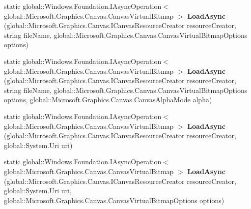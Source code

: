 \begin{DoxyCompactItemize}
\item 
\mbox{\label{class_microsoft_1_1_graphics_1_1_canvas_1_1_canvas_virtual_bitmap_a8f0bf16c94a9957cd9b4f30b7c8369f8}} 
static global\+::\+Windows.\+Foundation.\+I\+Async\+Operation$<$ global\+::\+Microsoft.\+Graphics.\+Canvas.\+Canvas\+Virtual\+Bitmap $>$ {\bfseries Load\+Async} (global\+::\+Microsoft.\+Graphics.\+Canvas.\+I\+Canvas\+Resource\+Creator resource\+Creator, string file\+Name, global\+::\+Microsoft.\+Graphics.\+Canvas.\+Canvas\+Virtual\+Bitmap\+Options options)
\item 
\mbox{\label{class_microsoft_1_1_graphics_1_1_canvas_1_1_canvas_virtual_bitmap_a72cf413902f0758c4707d6fc9c560914}} 
static global\+::\+Windows.\+Foundation.\+I\+Async\+Operation$<$ global\+::\+Microsoft.\+Graphics.\+Canvas.\+Canvas\+Virtual\+Bitmap $>$ {\bfseries Load\+Async} (global\+::\+Microsoft.\+Graphics.\+Canvas.\+I\+Canvas\+Resource\+Creator resource\+Creator, string file\+Name, global\+::\+Microsoft.\+Graphics.\+Canvas.\+Canvas\+Virtual\+Bitmap\+Options options, global\+::\+Microsoft.\+Graphics.\+Canvas.\+Canvas\+Alpha\+Mode alpha)
\item 
\mbox{\label{class_microsoft_1_1_graphics_1_1_canvas_1_1_canvas_virtual_bitmap_ad38275a64145b2d51079b6c5e251fab4}} 
static global\+::\+Windows.\+Foundation.\+I\+Async\+Operation$<$ global\+::\+Microsoft.\+Graphics.\+Canvas.\+Canvas\+Virtual\+Bitmap $>$ {\bfseries Load\+Async} (global\+::\+Microsoft.\+Graphics.\+Canvas.\+I\+Canvas\+Resource\+Creator resource\+Creator, global\+::\+System.\+Uri uri)
\item 
\mbox{\label{class_microsoft_1_1_graphics_1_1_canvas_1_1_canvas_virtual_bitmap_acd074c002643745470070fedca4bc142}} 
static global\+::\+Windows.\+Foundation.\+I\+Async\+Operation$<$ global\+::\+Microsoft.\+Graphics.\+Canvas.\+Canvas\+Virtual\+Bitmap $>$ {\bfseries Load\+Async} (global\+::\+Microsoft.\+Graphics.\+Canvas.\+I\+Canvas\+Resource\+Creator resource\+Creator, global\+::\+System.\+Uri uri, global\+::\+Microsoft.\+Graphics.\+Canvas.\+Canvas\+Virtual\+Bitmap\+Options options)
\item 
\mbox{\label{class_microsoft_1_1_graphics_1_1_canvas_1_1_canvas_virtual_bitmap_accb66d38d50f8d67a23664ce8819c262}} 

\end{DoxyCompactItemize}
